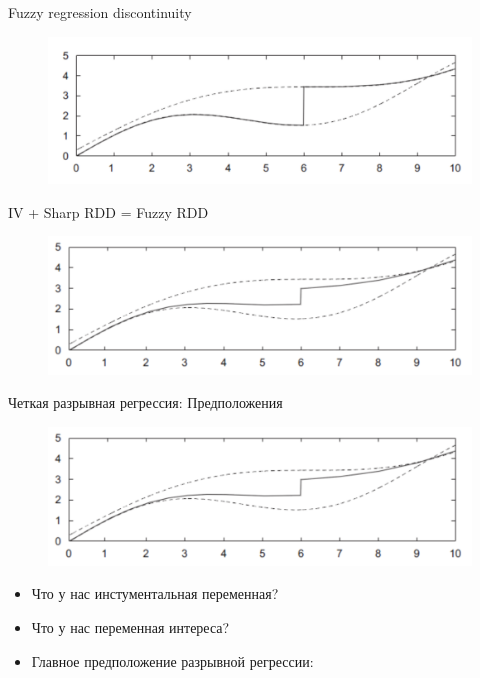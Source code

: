 \begin{frame}{Fuzzy regression discontinuity}
\begin{figure}
    \centering
    \includegraphics[width=\textwidth]{Images/sharp.png}
    \label{Sharp RDD}
\end{figure}
IV + Sharp RDD = Fuzzy RDD

\begin{figure}
    \centering
    \includegraphics[width=\textwidth]{Images/fuzzy.png}
    \label{Fuzzy RDD}
\end{figure}
\end{frame}


\begin{frame}{Четкая разрывная регрессия: Предположения}
    \begin{figure}
    \centering
    \includegraphics[width=\textwidth]{Images/fuzzy.png}
    \label{Fuzzy RDD}
\end{figure}
    \begin{itemize}
    \item Что у нас инстументальная переменная? 
    \item Что у нас переменная интереса? 
    \item Главное предположение разрывной регрессии: 
    \end{itemize}
\end{frame}
